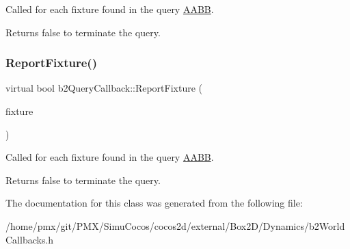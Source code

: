 Called for each fixture found in the query \hyperlink{classAABB}{A\+A\+BB}. \begin{DoxyReturn}{Returns}
false to terminate the query. 
\end{DoxyReturn}
\mbox{\label{classb2QueryCallback_a187dd04dd0f5164fb05c2ce2cbfd9ee5}} 
\subsubsection{\texorpdfstring{Report\+Fixture()}{ReportFixture()}\hspace{0.1cm}{\footnotesize\ttfamily [2/2]}}
{\footnotesize\ttfamily virtual bool b2\+Query\+Callback\+::\+Report\+Fixture (\begin{DoxyParamCaption}\item[{\hyperlink{classb2Fixture}{b2\+Fixture} $\ast$}]{fixture }\end{DoxyParamCaption})\hspace{0.3cm}{\ttfamily [pure virtual]}}

Called for each fixture found in the query \hyperlink{classAABB}{A\+A\+BB}. \begin{DoxyReturn}{Returns}
false to terminate the query. 
\end{DoxyReturn}


The documentation for this class was generated from the following file\+:\begin{DoxyCompactItemize}
\item 
/home/pmx/git/\+P\+M\+X/\+Simu\+Cocos/cocos2d/external/\+Box2\+D/\+Dynamics/b2\+World\+Callbacks.\+h\end{DoxyCompactItemize}
